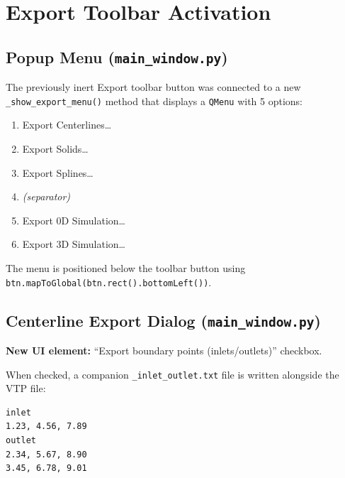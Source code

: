 \documentclass[11pt,a4paper]{article}
\begin{document}
\section{Export Toolbar Activation}

\subsection{Popup Menu (\texttt{main\_window.py})}

The previously inert Export toolbar button was connected to a new \texttt{\_show\_export\_menu()} method that displays a \texttt{QMenu} with 5 options:

\begin{enumerate}[nosep]
    \item Export Centerlines\ldots
    \item Export Solids\ldots
    \item Export Splines\ldots
    \item \textit{(separator)}
    \item Export 0D Simulation\ldots
    \item Export 3D Simulation\ldots
\end{enumerate}

The menu is positioned below the toolbar button using \texttt{btn.mapToGlobal(btn.rect().bottomLeft())}.

\subsection{Centerline Export Dialog (\texttt{main\_window.py})}

\textbf{New UI element:} ``Export boundary points (inlets/outlets)'' checkbox.

When checked, a companion \texttt{\_inlet\_outlet.txt} file is written alongside the VTP file:
\begin{lstlisting}[language={}]
inlet
1.23, 4.56, 7.89
outlet
2.34, 5.67, 8.90
3.45, 6.78, 9.01
\end{lstlisting}
\end{document}
